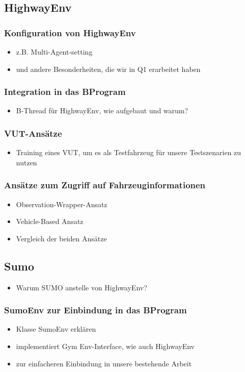 \subsection{HighwayEnv}
\subsubsection{Konfiguration von HighwayEnv}
\begin{itemize}
    \item z.B. Multi-Agent-setting
    \item und andere Besonderheiten, die wir in Q1 erarbeitet haben
\end{itemize}
\subsubsection{Integration in das BProgram}
\begin{itemize}
    \item B-Thread für HighwayEnv, wie aufgebaut und warum?
\end{itemize}
\subsubsection{VUT-Ansätze}
\begin{itemize}
    \item Training eines VUT, um es als Testfahrzeug für unsere Testszenarien zu nutzen
\end{itemize}
\subsubsection{Ansätze zum Zugriff auf Fahrzeuginformationen}
\begin{itemize}
    \item Observation-Wrapper-Ansatz
    \item Vehicle-Based Ansatz
    \item Vergleich der beiden Ansätze
\end{itemize}
\subsection{Sumo}
\begin{itemize}
    \item Warum SUMO anstelle von HighwayEnv?
\end{itemize}
\subsubsection{SumoEnv zur Einbindung in das BProgram}
\begin{itemize}
    \item Klasse SumoEnv erklären
    \item implementiert Gym Env-Interface, wie auch HighwayEnv
    \item zur einfacheren Einbindung in unsere bestehende Arbeit
\end{itemize}
